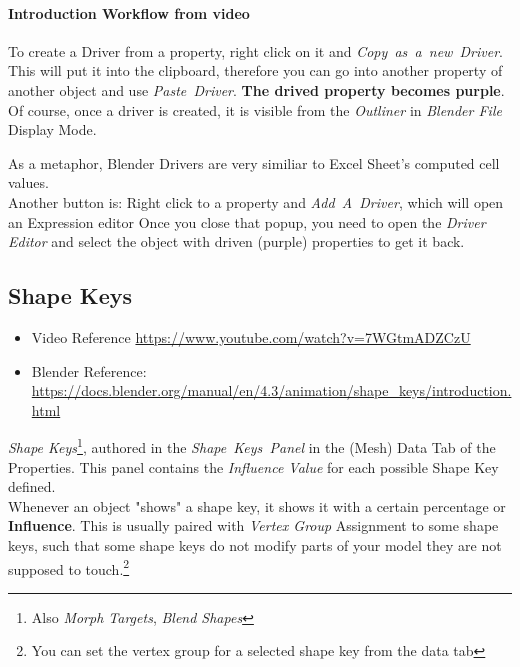 \documentclass{article}
\begin{document}
\hfill
\begin{minipage}{0.7\textwidth}
\paragraph{Introduction Workflow from video}
To create a Driver from a property, right click on it and \mbox{\textit{Copy as a new Driver}}. This will put it into the clipboard, therefore you can go into another property of another object and 
use \mbox{\textit{Paste Driver}}. \textbf{The drived property becomes purple}.\\
Of course, once a driver is created, it is visible from the \textit{Outliner} in \textit{Blender File} Display Mode.\par
As a metaphor, Blender Drivers are very similiar to Excel Sheet's computed cell values.\\
Another button is: Right click to a property and \mbox{\textit{Add A Driver}}, which will open an Expression editor
Once you close that popup, you need to open the \textit{Driver Editor} and select the object with driven (purple) properties to get it back.
\subsection{Shape Keys}\label{shapekeys}
\begin{itemize}[noitemsep, topsep=0pt]
    \item Video Reference \url{https://www.youtube.com/watch?v=7WGtmADZCzU}
    \item Blender Reference: \url{https://docs.blender.org/manual/en/4.3/animation/shape_keys/introduction.html}
\end{itemize}
\textit{Shape Keys}\footnote{Also \textit{Morph Targets}, \textit{Blend Shapes}}, authored in the \mbox{\textit{Shape Keys Panel}} in the (Mesh) Data Tab of the Properties. This panel contains
the \textit{Influence Value} for each possible Shape Key defined.\\
Whenever an object "shows" a shape key, it shows it with a certain percentage or \textbf{Influence}. This is usually paired with \textit{Vertex Group} Assignment to some shape keys, such that
some shape keys do not modify parts of your model they are not supposed to touch.\footnote{You can set the vertex group for a selected shape key from the data tab}
\end{minipage}
\end{document}
